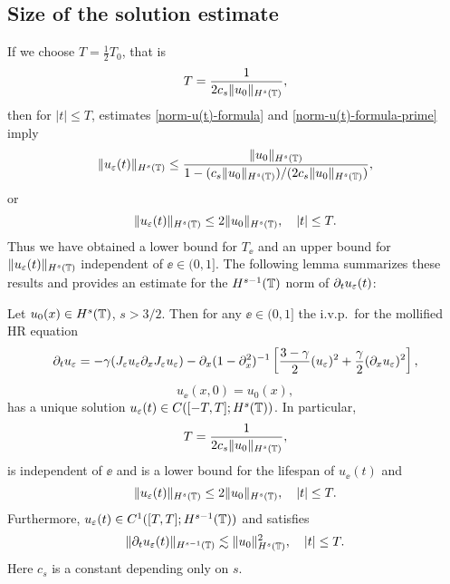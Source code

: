 \subsection{Size of the solution estimate} If we choose  $T=\frac12 T_0$, that is
%
\begin{equation} 
\label{T-def}
T
=
\frac{1}{2 c_s \|u_0\|_{H^s(\mathbb{T})}},
\end{equation}
%
then for $|t| \le T$, estimates \eqref{norm-u(t)-formula} and
\eqref{norm-u(t)-formula-prime} imply 
%
\begin{equation*} 
\label{u(t)-u(0)-bound}
\|u_\varepsilon(t)\|_{H^s(\mathbb{T})}
\le
\frac{\|u_0\|_{H^s(\mathbb{T})}}{1-(c_s\|u_0\|_{H^s(\mathbb{T})})/(2 c_s \|u_0\|_{H^s(\mathbb{T})})},
\end{equation*}
%
or 
%
\begin{equation} 
\|u_\varepsilon(t)\|_{H^s(\mathbb{T})}
\le
2 \|u_0\|_{H^s(\mathbb{T})},
\quad 
|t| \le T.
\end{equation}
%
Thus we have obtained a lower bound for $T_\ee$ and an upper bound for
$\|u_\varepsilon(t)\|_{H^s(\mathbb{T})}$ independent of $\ee\in (0, 1]$. The following
lemma summarizes these results and provides an estimate for the
$H^{s-1}(\mathbb{T})$ norm of $\partial_t u_\varepsilon(t)$:
%
%
\begin{lemma}
\label{hr_wp}
Let  $u_0(x) \in  H^s(\mathbb{T})$, $s >3/2$. Then for any $\ee\in (0, 1]$
the i.v.p.\ for the mollified HR equation 
%
\begin{equation} 
\label{hr-moli-2}
\partial_t  u_\varepsilon 
=
-\gamma (J_\varepsilon u_\varepsilon \partial_x  J_\varepsilon  u_\varepsilon) - \partial_x (1-\partial_x^2)^{-1} \left
[\frac{3-\gamma}{2}(u_\varepsilon)^2 + \frac{\gamma}{2}(\partial_x u_\varepsilon)^2
\right ], 
\end{equation} 
%
\begin{equation} 
\label{burgers-moli-data-2} 
u_\ee(x, 0) = u_0 (x),
\end{equation}
%
has a unique solution $u_\varepsilon( t)\in C([-T, T]; H^s(\mathbb{T}))$. 
In particular,
%
\begin{equation} 
\label{life-est}
T
=
\frac{1}{2 c_s \|u_0\|_{H^s(\mathbb{T})}},
\end{equation}
%
is independent of $\ee$ and
is a lower bound for the lifespan of $u_\ee( t)$ and
%
\begin{equation}
\label{u-e-Hs-bound}
\|u_\varepsilon(t)\|_{H^s(\mathbb{T})}
\le
2 \|u_0 \|_{H^s(\mathbb{T})},
\quad
|t| \le T.
\end{equation}
%
Furthermore,  $u_\varepsilon( t)\in C^1([T, T]; H^{s-1}(\mathbb{T}))$ and 
satisfies
\begin{equation}
\label{dt-u-e-Hs-bound}
\|\partial_t u_\varepsilon(t)\|_{H^{s-1}(\mathbb{T})}
\lesssim
\|u_0 \|_{H^s(\mathbb{T})}^2,
\quad
|t| \le T.
\end{equation}
% 
Here  $c_s$ is a constant depending only on $s$.
\end{lemma}
